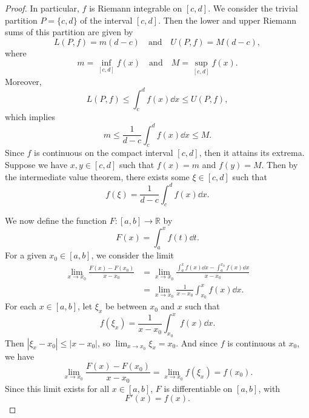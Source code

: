\documentclass[12pt]{article}
\theoremstyle{definition}
\newcommand{\ds}{\displaystyle}
\newcommand{\isp}[1]{\quad\text{#1}\quad}
\newcommand{\R}{\mathbb{R}}
\begin{document}
\begin{proof}
    In particular, $f$ is Riemann integrable on $[c, d]$. We consider the trivial partition $P = \{c, d\}$ of the interval $[c, d]$. Then the lower and upper Riemann sums of this partition are given by
    \[
        L(P, f) = m(d - c) \isp{and} U(P, f) = M(d - c),
    \]
    where
    \[
        m = \inf_{[c, d]} f(x) \isp{and} M = \sup_{[c, d]} f(x).
    \]
    Moreover,
    \[
         L(P, f) \leq \int_c^d f(x) \dd{x} \leq U(P, f),
    \]
    which implies
    \[
        m \leq \frac{1}{d - c}\int_c^d f(x) \dd{x} \leq M.
    \]
    Since $f$ is continuous on the compact interval $[c, d]$, then it attains its extrema. Suppose we have $x, y \in [c, d]$ such that $f(x) = m$ and $f(y) = M$. Then by the intermediate value theorem, there exists some $\xi \in [c, d]$ such that
    \[
        f(\xi) = \frac{1}{d - c}\int_c^d f(x) \dd{x}.
    \]
    
    We now define the function $F : [a, b] \to \R$ by
    \[
        F(x) = \int_a^x f(t) \dd{t}.
    \]
    For a given $x_0 \in [a, b]$, we consider the limit
    \begin{align*}
        \lim_{x \to x_0} \frac{F(x) - F(x_0)}{x - x_0}
            &= \lim_{x \to x_0} \frac{\int_a^x f(x) \dd{x} - \int_a^{x_0} f(x) \dd{x}}{x - x_0} \\
            &= \lim_{x \to x_0} \frac{1}{x - x_0}\int_{x_0}^x f(x) \dd{x}.
    \end{align*}
    For each $x \in [a, b]$, let $\xi_x$ be between $x_0$ and $x$ such that
    \[
        f(\xi_x) = \frac{1}{x - x_0}\int_{x_0}^x f(x) \dd{x}.
    \]
    Then $|\xi_x - x_0| \leq |x - x_0|$, so $\ds\lim_{x \to x_0} \xi_x = x_0$. And since $f$ is continuous at $x_0$, we have
    \[
        \lim_{x \to x_0} \frac{F(x) - F(x_0)}{x - x_0}
            = \lim_{x \to x_0} f(\xi_x)
            = f(x_0).
    \]
    Since this limit exists for all $x \in [a, b]$, $F$ is differentiable on $[a, b]$, with
    \[
        F'(x) = f(x).
    \]
    
    
\end{proof}


\newpage
\end{document}
